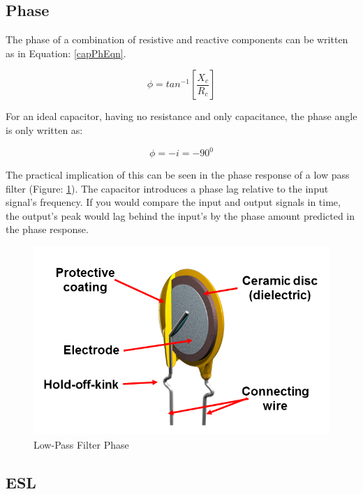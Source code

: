 \subsection{Phase}

The phase of a combination of resistive and reactive components can be written as in Equation: \eqref{capPhEqn}.

\begin{equation}
\label{capPhEqn}
\phi = tan^{-1}[\frac{X_c}{R_c}]
\end{equation}

For an ideal capacitor, having no resistance and only capacitance, the phase angle is only written as:

\begin{equation}
\label{capImpEqu2}
\phi = -i = -90^0
\end{equation}

The practical implication of this can be seen in the phase response of a low pass filter (Figure: \ref{lpFiltPhaseFig}). The capacitor introduces a phase lag relative to the input signal's frequency. If you would compare the input and output signals in time, the output's peak would lag behind the input's by the phase amount predicted in the phase response.

\begin{figure}
    \includegraphics[keepaspectratio=true,scale=.5]{./figures/testImage.png}
    \centering
    \caption{Low-Pass Filter Phase}
    \label{lpFiltPhaseFig}
\end{figure}

\subsection{ESL}

